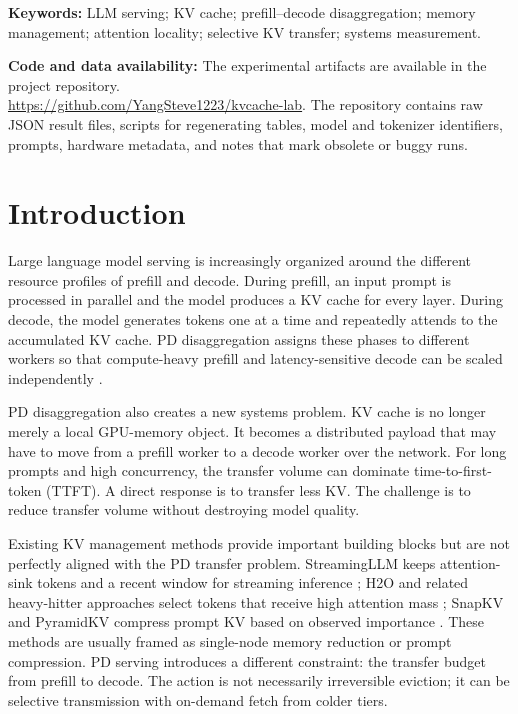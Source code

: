 \documentclass[11pt]{article}
\theoremstyle{definition}
\theoremstyle{plain}
\begin{document}
\noindent\textbf{Keywords:} LLM serving; KV cache; prefill--decode disaggregation; memory management; attention locality; selective KV transfer; systems measurement.

\noindent\textbf{Code and data availability:} The experimental artifacts are available in the project repository.\\
\url{https://github.com/YangSteve1223/kvcache-lab}.  The repository contains raw JSON result files, scripts for regenerating tables, model and tokenizer identifiers, prompts, hardware metadata, and notes that mark obsolete or buggy runs.

\section{Introduction}
\label{sec:introduction}

Large language model serving is increasingly organized around the different resource profiles of prefill and decode.  During prefill, an input prompt is processed in parallel and the model produces a KV cache for every layer.  During decode, the model generates tokens one at a time and repeatedly attends to the accumulated KV cache.  PD disaggregation assigns these phases to different workers so that compute-heavy prefill and latency-sensitive decode can be scaled independently \citep{splitwise,distserve,mooncake}.

PD disaggregation also creates a new systems problem.  KV cache is no longer merely a local GPU-memory object.  It becomes a distributed payload that may have to move from a prefill worker to a decode worker over the network.  For long prompts and high concurrency, the transfer volume can dominate time-to-first-token (TTFT).  A direct response is to transfer less KV.  The challenge is to reduce transfer volume without destroying model quality.

Existing KV management methods provide important building blocks but are not perfectly aligned with the PD transfer problem.  StreamingLLM keeps attention-sink tokens and a recent window for streaming inference \citep{streamingllm}; H2O and related heavy-hitter approaches select tokens that receive high attention mass \citep{h2o}; SnapKV and PyramidKV compress prompt KV based on observed importance \citep{snapkv,pyramidkv}.  These methods are usually framed as single-node memory reduction or prompt compression.  PD serving introduces a different constraint: the transfer budget from prefill to decode.  The action is not necessarily irreversible eviction; it can be selective transmission with on-demand fetch from colder tiers.
\end{document}
